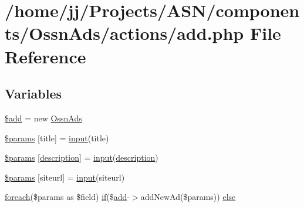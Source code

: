 \hypertarget{components_2_ossn_ads_2actions_2add_8php}{}\section{/home/jj/\+Projects/\+A\+S\+N/components/\+Ossn\+Ads/actions/add.php File Reference}
\label{components_2_ossn_ads_2actions_2add_8php}
\subsection*{Variables}
\begin{DoxyCompactItemize}
\item 
\hyperlink{components_2_ossn_ads_2actions_2add_8php_a76aeb354fc71a358526ea9fbd7aae7a4}{\$add} = new \hyperlink{class_ossn_ads}{Ossn\+Ads}
\item 
\hyperlink{components_2_ossn_ads_2actions_2add_8php_af32dd378cc53c2808c30eef45b59e35b}{\$params} \mbox{[}\textquotesingle{}title\textquotesingle{}\mbox{]} = \hyperlink{ossn_8lib_8input_8php_a64ebee98b041c4f75f71ed3cd73cc8ed}{input}(\textquotesingle{}title\textquotesingle{})
\item 
\hyperlink{components_2_ossn_ads_2actions_2add_8php_aafea17cf6bee6d7d0438786e422c0ef3}{\$params} \mbox{[}\textquotesingle{}\hyperlink{components_2_ossn_wall_2actions_2wall_2post_2edit_8php_a7f60fcaa72b0968e6b6bd7d819fa6fd9}{description}\textquotesingle{}\mbox{]} = \hyperlink{ossn_8lib_8input_8php_a64ebee98b041c4f75f71ed3cd73cc8ed}{input}(\textquotesingle{}\hyperlink{components_2_ossn_wall_2actions_2wall_2post_2edit_8php_a7f60fcaa72b0968e6b6bd7d819fa6fd9}{description}\textquotesingle{})
\item 
\hyperlink{components_2_ossn_ads_2actions_2add_8php_ad013faa5eae30b9aa01b44779a88194b}{\$params} \mbox{[}\textquotesingle{}siteurl\textquotesingle{}\mbox{]} = \hyperlink{ossn_8lib_8input_8php_a64ebee98b041c4f75f71ed3cd73cc8ed}{input}(\textquotesingle{}siteurl\textquotesingle{})
\item 
\hyperlink{user__timeline_8php_a1b18c909b5f0affc85267f294d947c4b}{foreach}(\$params as \$field) \hyperlink{jquery_8tokeninput_8js_ad8dd46a3cbc004569e34401e9e71771a}{if}(\$\hyperlink{theme_8min_8js_a79ed6f45c867c160601f70dfa5ec2f95}{add}-\/$>$add\+New\+Ad(\$params)) \hyperlink{components_2_ossn_ads_2actions_2add_8php_af2728a4fd6840cd6df9e2751bc15f9d2}{else}
\end{DoxyCompactItemize}


